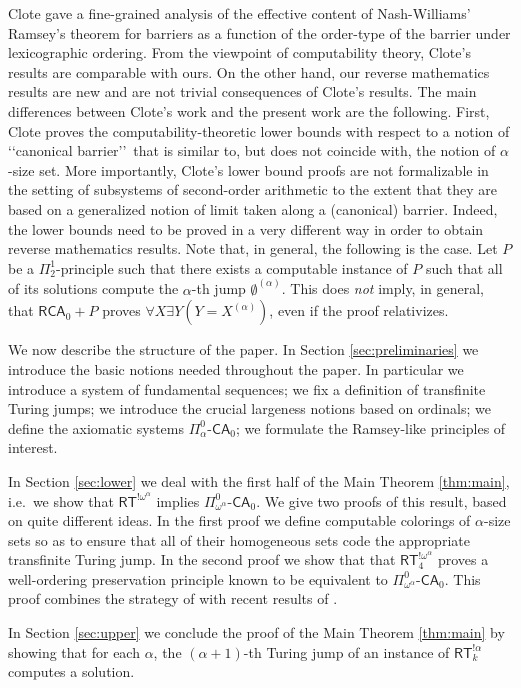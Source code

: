\documentclass[11pt]{amsart}
\theoremstyle{definition}
\theoremstyle{remark}
\theoremstyle{plain}
\def\om{\omega}
\def\a{\alpha}
\newcommand{\RCA}{\mathsf{RCA}_0}
\newcommand{\RT}{\mathsf{RT}}
\newcommand{\CA}{\mathsf{\text{-}CA}_0}
\begin{document}
Clote \cite{clote1984recursion,clote1986generalization} gave a fine-grained analysis of the effective content of Nash-Williams' Ramsey's theorem for barriers as a function of the order-type of the barrier under lexicographic ordering. 
From the viewpoint of computability theory, Clote's results are comparable with ours. 
On the other hand, our reverse mathematics results are new and are not trivial consequences of Clote's results. 
The main differences between Clote's work and the present work are the following. 
First, Clote proves the computability-theoretic lower bounds with respect to a notion of \lq\lq canonical barrier\rq\rq\ that is similar to, but does not coincide with, the notion of $\a$-size set. 
More importantly, Clote's lower bound proofs are not formalizable in the setting of subsystems of second-order arithmetic to the extent that they are based on a generalized notion of limit taken along a (canonical) barrier. 
Indeed, the lower bounds need to be proved in a very different way in order to obtain reverse mathematics results. 
Note that, in general, the following is the case. 
Let $P$ be a $\Pi^1_2$-principle such that there exists a computable instance of $P$ such that all of its solutions compute the $\alpha$-th jump $\emptyset^{(\a)}$. 
This does {\em not} imply, in general, that $\RCA + P$ proves $\forall X \exists Y (Y = X^{(\a)})$, even if the proof relativizes. 

We now describe the structure of the paper.
In Section \ref{sec:preliminaries} we introduce the basic notions needed throughout the paper.
In particular we introduce a system of fundamental sequences; we fix a definition of transfinite Turing jumps; we introduce the crucial largeness notions based on ordinals; we define the axiomatic systems $\Pi^0_{\alpha} \CA$; we formulate the Ramsey-like principles of interest.

In Section \ref{sec:lower} we deal with the first half of the Main Theorem \ref{thm:main}, i.e.\ we show that $\RT^{! \om^\a}$ implies $\Pi^0_{\om^\a} \CA$. 
We give two proofs of this result, based on quite different ideas. 
In the first proof we define computable colorings of $\a$-size sets so as to ensure that all of their homogeneous sets code the appropriate transfinite Turing jump.
In the second proof we show that that $\RT^{! \om^\a}_4$ proves a well-ordering preservation principle known to be equivalent to $\Pi^0_{\om^\a} \CA$. 
This proof combines the strategy of \cite{carlucci2025} with recent results of \cite{marcone2025}.

In Section \ref{sec:upper} we conclude the proof of the Main Theorem \ref{thm:main} by showing that for each $\a$, the $(\a+1)$-th Turing jump of an instance of $\RT^{!\a}_k$ computes a solution.
\end{document}
